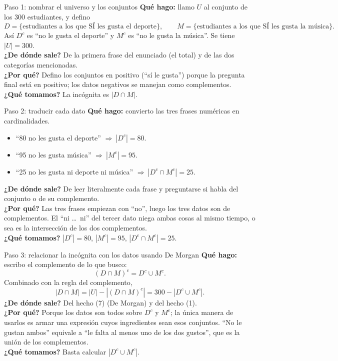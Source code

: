 \documentclass[11pt]{article}
\begin{document}
\begin{sol}

\begin{paso}{Paso 1: nombrar el universo y los conjuntos}
\textbf{Qu\'e hago:} llamo $U$ al conjunto de los $300$ estudiantes, y defino
\[
D=\{\text{estudiantes a los que S\'I les gusta el deporte}\},\qquad
M=\{\text{estudiantes a los que S\'I les gusta la m\'usica}\}.
\]
As\'i $D^{c}$ es ``no le gusta el deporte'' y $M^{c}$ es ``no le gusta la m\'usica''. Se tiene $|U|=300$.\\
\textbf{¿De d\'onde sale?} De la primera frase del enunciado (el total) y de las dos categor\'ias mencionadas.\\
\textbf{¿Por qu\'e?} Defino los conjuntos en positivo (``s\'i le gusta'') porque la pregunta final est\'a en positivo; los datos negativos se manejan como complementos.\\
\textbf{¿Qu\'e tomamos?} La inc\'ognita es $|D\cap M|$.
\end{paso}

\begin{paso}{Paso 2: traducir cada dato}
\textbf{Qu\'e hago:} convierto las tres frases num\'ericas en cardinalidades.
\begin{itemize}[leftmargin=*]
  \item ``80 no les gusta el deporte'' $\Longrightarrow\ |D^{c}| = 80$.
  \item ``95 no les gusta m\'usica'' $\Longrightarrow\ |M^{c}| = 95$.
  \item ``25 no les gusta ni deporte ni m\'usica'' $\Longrightarrow\ |D^{c}\cap M^{c}| = 25$.
\end{itemize}
\textbf{¿De d\'onde sale?} De leer literalmente cada frase y preguntarse si habla del conjunto o de su complemento.\\
\textbf{¿Por qu\'e?} Las tres frases empiezan con ``no'', luego los tres datos son de complementos. El ``ni \dots\ ni'' del tercer dato niega ambas cosas al mismo tiempo, o sea es la intersecci\'on de los dos complementos.\\
\textbf{¿Qu\'e tomamos?} $|D^{c}|=80$, $|M^{c}|=95$, $|D^{c}\cap M^{c}|=25$.
\end{paso}

\begin{paso}{Paso 3: relacionar la inc\'ognita con los datos usando De Morgan}
\textbf{Qu\'e hago:} escribo el complemento de lo que busco:
\[
(D\cap M)^{c} = D^{c}\cup M^{c}.
\]
Combinado con la regla del complemento,
\[
|D\cap M| = |U| - |(D\cap M)^{c}| = 300 - |D^{c}\cup M^{c}| .
\]
\textbf{¿De d\'onde sale?} Del hecho (7) (De Morgan) y del hecho (1).\\
\textbf{¿Por qu\'e?} Porque los datos son todos sobre $D^{c}$ y $M^{c}$; la \'unica manera de usarlos es armar una expresi\'on cuyos ingredientes sean esos conjuntos. ``No le gustan ambos'' equivale a ``le falta al menos uno de los dos gustos'', que es la uni\'on de los complementos.\\
\textbf{¿Qu\'e tomamos?} Basta calcular $|D^{c}\cup M^{c}|$.
\end{paso}


\end{sol}
\end{document}
